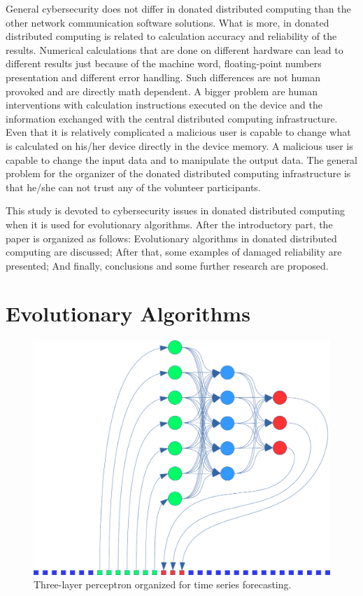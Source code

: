 \documentclass[graybox]{svmult}
\begin{document}
General cybersecurity does not differ in donated distributed computing than the other network communication software solutions. What is more, in donated distributed computing is related to calculation accuracy and reliability of the results. Numerical calculations that are done on different hardware can lead to different results just because of the machine word, floating-point numbers presentation and different error handling. Such differences are not human provoked and are directly math dependent. A bigger problem are human interventions with calculation instructions executed on the device and the information exchanged with the central distributed computing infrastructure. Even that it is relatively complicated a malicious user is capable to change what is calculated on his/her device directly in the device memory. A malicious user is capable to change the input data and to manipulate the output data. The general problem for the organizer of the donated distributed computing infrastructure is that he/she can not trust any of the volunteer participants. 

This study is devoted to cybersecurity issues in donated distributed computing when it is used for evolutionary algorithms. After the introductory part, the paper is organized as follows: Evolutionary algorithms in donated distributed computing are discussed; After that, some examples of damaged reliability are presented; And finally, conclusions and some further research are proposed. 

\section{Evolutionary Algorithms}
\label{sec:02}

\begin{figure}[b]
\sidecaption
\includegraphics[width=\textwidth,height=0.5\textwidth]{fig02}
\caption{Three-layer perceptron organized for time series forecasting.}
\label{fig:02}
\end{figure}
\end{document}
